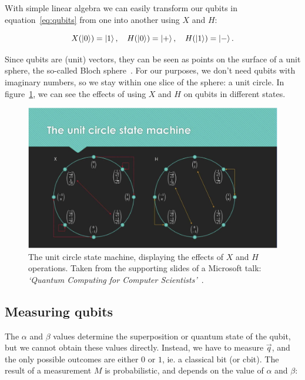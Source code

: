 \documentclass[oneside,a4paper]{article}
\begin{document}
With simple linear algebra we can easily transform our qubits in equation~\ref{eq:qubits} from one into another using $X$ and $H$:

\begin{equation}
    \label{eq:operations}
    X(\ket{0}) = \ket{1},
    \quad H(\ket{0})=\ket{+},
    \quad H(\ket{1})=\ket{-}.
\end{equation}

Since qubits are (unit) vectors, they can be seen as points on the surface of a unit sphere, the so-called Bloch sphere~\cite{bloch1946nuclear}.
For our purposes, we don't need qubits with imaginary numbers, so we stay within one slice of the sphere: a unit circle.
In figure~\ref{fig:unit-circle}, we can see the effects of using $X$ and $H$ on qubits in different states.

\begin{figure}
    \centering
    \includegraphics[width=\linewidth]{microsoft-quantum-coding-unit-circle}
    \caption{The unit circle state machine, displaying the effects of $X$ and $H$ operations. Taken from the supporting slides of a Microsoft talk: \emph{`Quantum Computing for Computer Scientists'}~\cite{quantum-computing-talk}.}
    \label{fig:unit-circle}
\end{figure}


\subsection{Measuring qubits}
The $\alpha$ and $\beta$ values determine the superposition or quantum state of the qubit, but we cannot obtain these values directly.
Instead, we have to measure $\vec{q}$, and the only possible outcomes are either $0$ or $1$, ie. a classical bit (or cbit).
The result of a measurement $M$ is probabilistic, and depends on the value of $\alpha$ and $\beta$:
\end{document}
